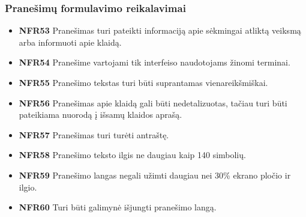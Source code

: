 \documentclass{VUMIFPSbakalaurinis}
\begin{document}
\subsubsection{Pranešimų formulavimo reikalavimai}
\begin{itemize}
	\item \textbf{NFR53} Pranešimas turi pateikti informaciją apie sėkmingai atliktą veiksmą arba informuoti apie klaidą.
	\item \textbf{NFR54} Pranešime vartojami tik interfeiso naudotojams žinomi terminai.
	\item \textbf{NFR55} Pranešimo tekstas turi būti suprantamas vienareikšmiškai.
	\item \textbf{NFR56} Pranešimas apie klaidą gali būti nedetalizuotas, tačiau turi būti pateikiama nuorodą į išsamų klaidos aprašą.
	\item \textbf{NFR57} Pranešimas turi turėti antraštę.
	\item \textbf{NFR58} Pranešimo teksto ilgis ne daugiau kaip 140 simbolių.
	\item \textbf{NFR59} Pranešimo langas negali užimti daugiau nei 30\% ekrano pločio ir ilgio.
	\item \textbf{NFR60} Turi būti galimynė išjungti pranešimo langą.
\end{itemize}
\end{document}
